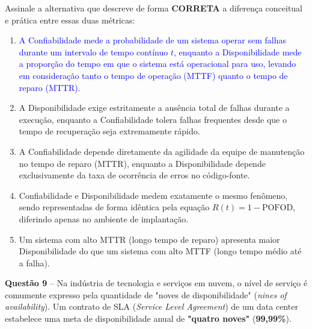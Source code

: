 \documentclass[12pt,a4paper]{article}
\begin{document}
\vspace{0.2cm}

Assinale a alternativa que descreve de forma \textbf{CORRETA} a diferença conceitual e prática entre essas duas métricas:

\vspace{0.3cm}

\begin{enumerate}[label=\textbf{(\Alph*)}]
    \item[\textcolor{blue}{\textbf{(A)}}] \textcolor{blue}{A Confiabilidade mede a probabilidade de um sistema operar sem falhas durante um intervalo de tempo contínuo $t$, enquanto a Disponibilidade mede a proporção do tempo em que o sistema está operacional para uso, levando em consideração tanto o tempo de operação (MTTF) quanto o tempo de reparo (MTTR).}

    \item A Disponibilidade exige estritamente a ausência total de falhas durante a execução, enquanto a Confiabilidade tolera falhas frequentes desde que o tempo de recuperação seja extremamente rápido.

    \item A Confiabilidade depende diretamente da agilidade da equipe de manutenção no tempo de reparo (MTTR), enquanto a Disponibilidade depende exclusivamente da taxa de ocorrência de erros no código-fonte.

    \item Confiabilidade e Disponibilidade medem exatamente o mesmo fenômeno, sendo representadas de forma idêntica pela equação $R(t) = 1 - \text{POFOD}$, diferindo apenas no ambiente de implantação.

    \item Um sistema com alto MTTR (longo tempo de reparo) apresenta maior Disponibilidade do que um sistema com alto MTTF (longo tempo médio até a falha).
\end{enumerate}

\vspace{0.5cm}

\textbf{Questão 9} -- Na indústria de tecnologia e serviços em nuvem, o nível de serviço é comumente expresso pela quantidade de "noves de disponibilidade" (\textit{nines of availability}). Um contrato de SLA (\textit{Service Level Agreement}) de um data center estabelece uma meta de disponibilidade anual de \textbf{"quatro noves"} (\textbf{99,99\%}).
\end{document}

